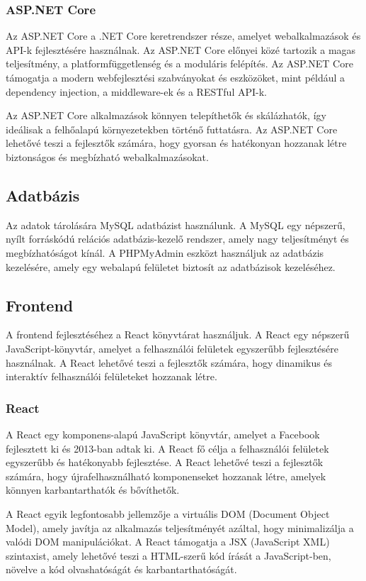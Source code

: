 \documentclass{article}
\begin{document}
\subsubsection{ASP.NET Core}
Az ASP.NET Core a .NET Core keretrendszer része, amelyet webalkalmazások és API-k fejlesztésére használnak. Az ASP.NET Core előnyei közé tartozik a magas teljesítmény, a platformfüggetlenség és a moduláris felépítés. Az ASP.NET Core támogatja a modern webfejlesztési szabványokat és eszközöket, mint például a dependency injection, a middleware-ek és a RESTful API-k.

Az ASP.NET Core alkalmazások könnyen telepíthetők és skálázhatók, így ideálisak a felhőalapú környezetekben történő futtatásra. Az ASP.NET Core lehetővé teszi a fejlesztők számára, hogy gyorsan és hatékonyan hozzanak létre biztonságos és megbízható webalkalmazásokat.

\subsection{Adatbázis}
Az adatok tárolására MySQL adatbázist használunk. A MySQL egy népszerű, nyílt forráskódú relációs adatbázis-kezelő rendszer, amely nagy teljesítményt és megbízhatóságot kínál. A PHPMyAdmin eszközt használjuk az adatbázis kezelésére, amely egy webalapú felületet biztosít az adatbázisok kezeléséhez.

\subsection{Frontend}
A frontend fejlesztéséhez a React könyvtárat használjuk. A React egy népszerű JavaScript-könyvtár, amelyet a felhasználói felületek egyszerűbb fejlesztésére használnak. A React lehetővé teszi a fejlesztők számára, hogy dinamikus és interaktív felhasználói felületeket hozzanak létre.

\subsubsection{React}
A React egy komponens-alapú JavaScript könyvtár, amelyet a Facebook fejlesztett ki és 2013-ban adtak ki. A React fő célja a felhasználói felületek egyszerűbb és hatékonyabb fejlesztése. A React lehetővé teszi a fejlesztők számára, hogy újrafelhasználható komponenseket hozzanak létre, amelyek könnyen karbantarthatók és bővíthetők.

A React egyik legfontosabb jellemzője a virtuális DOM (Document Object Model), amely javítja az alkalmazás teljesítményét azáltal, hogy minimalizálja a valódi DOM manipulációkat. A React támogatja a JSX (JavaScript XML) szintaxist, amely lehetővé teszi a HTML-szerű kód írását a JavaScript-ben, növelve a kód olvashatóságát és karbantarthatóságát.
\end{document}
